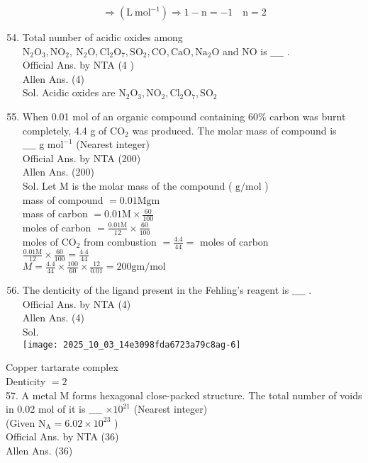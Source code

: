 \documentclass[10pt]{article}
\begin{document}
\[
\Rightarrow\left(\mathrm{L} \mathrm{~mol}^{-1}\right) \Rightarrow 1-\mathrm{n}=-1 \quad \mathrm{n}=2
\]

\begin{enumerate}
  \setcounter{enumi}{53}
  \item Total number of acidic oxides among\\
\(\mathrm{N}_{2} \mathrm{O}_{3}, \mathrm{NO}_{2}, \mathrm{~N}_{2} \mathrm{O}, \mathrm{Cl}_{2} \mathrm{O}_{7}, \mathrm{SO}_{2}, \mathrm{CO}, \mathrm{CaO}, \mathrm{Na}_{2} \mathrm{O}\) and NO is \(\_\_\_\_\) .\\
Official Ans. by NTA (4 )\\
Allen Ans. (4)\\
Sol. Acidic oxides are \(\mathrm{N}_{2} \mathrm{O}_{3}, \mathrm{NO}_{2}, \mathrm{Cl}_{2} \mathrm{O}_{7}, \mathrm{SO}_{2}\)
  \item When 0.01 mol of an organic compound containing \(60 \%\) carbon was burnt completely, 4.4 g of \(\mathrm{CO}_{2}\) was produced. The molar mass of compound is\\
\(\_\_\_\_\) g \(\mathrm{mol}^{-1}\) (Nearest integer)\\
Official Ans. by NTA (200)\\
Allen Ans. (200)\\
Sol. Let M is the molar mass of the compound ( \(\mathrm{g} / \mathrm{mol}\) )\\
mass of compound \(=0.01 \mathrm{Mgm}\)\\
mass of carbon \(=0.01 \mathrm{M} \times \frac{60}{100}\)\\
moles of carbon \(=\frac{0.01 \mathrm{M}}{12} \times \frac{60}{100}\)\\
moles of \(\mathrm{CO}_{2}\) from combustion \(=\frac{4.4}{44}=\) moles of carbon\\
\(\frac{0.01 \mathrm{M}}{12} \times \frac{60}{100}=\frac{4.4}{44}\)\\
\(M=\frac{4.4}{44} \times \frac{100}{60} \times \frac{12}{0.01}=200 \mathrm{gm} / \mathrm{mol}\)
  \item The denticity of the ligand present in the Fehling's reagent is \(\_\_\_\_\) .\\
Official Ans. by NTA (4)\\
Allen Ans. (4)\\
Sol.\\
\texttt{[image: 2025\_10\_03\_14e3098fda6723a79c8ag-6]}
\end{enumerate}

Copper tartarate complex\\
Denticity \(=2\)\\
57. A metal M forms hexagonal close-packed structure. The total number of voids in 0.02 mol of it is \(\_\_\_\_\) \(\times 10^{21}\) (Nearest integer)\\
(Given \(\mathrm{N}_{\mathrm{A}}=6.02 \times 10^{23}\) )\\
Official Ans. by NTA (36)\\
Allen Ans. (36)
\end{document}
